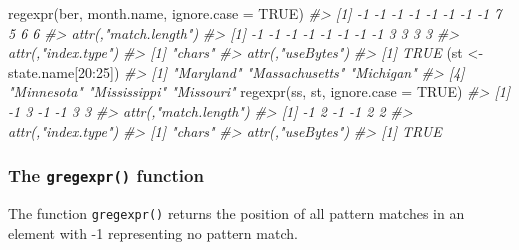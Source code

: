\documentclass[
]{book}
\newenvironment{Shaded}{\begin{snugshade}}{\end{snugshade}}
\newcommand{\AttributeTok}[1]{\textcolor[rgb]{0.77,0.63,0.00}{#1}}
\newcommand{\CommentTok}[1]{\textcolor[rgb]{0.56,0.35,0.01}{\textit{#1}}}
\newcommand{\ConstantTok}[1]{\textcolor[rgb]{0.00,0.00,0.00}{#1}}
\newcommand{\DecValTok}[1]{\textcolor[rgb]{0.00,0.00,0.81}{#1}}
\newcommand{\FunctionTok}[1]{\textcolor[rgb]{0.00,0.00,0.00}{#1}}
\newcommand{\NormalTok}[1]{#1}
\newcommand{\OtherTok}[1]{\textcolor[rgb]{0.56,0.35,0.01}{#1}}
\newcommand{\SpecialCharTok}[1]{\textcolor[rgb]{0.00,0.00,0.00}{#1}}
\newcommand{\StringTok}[1]{\textcolor[rgb]{0.31,0.60,0.02}{#1}}
\begin{document}
\begin{Shaded}
\begin{Highlighting}[]
\FunctionTok{regexpr}\NormalTok{(}\StringTok{\textquotesingle{}ber\textquotesingle{}}\NormalTok{, month.name, }\AttributeTok{ignore.case =} \ConstantTok{TRUE}\NormalTok{)}
\CommentTok{\#\textgreater{}  [1] {-}1 {-}1 {-}1 {-}1 {-}1 {-}1 {-}1 {-}1  7  5  6  6}
\CommentTok{\#\textgreater{} attr(,"match.length")}
\CommentTok{\#\textgreater{}  [1] {-}1 {-}1 {-}1 {-}1 {-}1 {-}1 {-}1 {-}1  3  3  3  3}
\CommentTok{\#\textgreater{} attr(,"index.type")}
\CommentTok{\#\textgreater{} [1] "chars"}
\CommentTok{\#\textgreater{} attr(,"useBytes")}
\CommentTok{\#\textgreater{} [1] TRUE}
\NormalTok{(st }\OtherTok{\textless{}{-}}\NormalTok{ state.name[}\DecValTok{20}\SpecialCharTok{:}\DecValTok{25}\NormalTok{])}
\CommentTok{\#\textgreater{} [1] "Maryland"      "Massachusetts" "Michigan"     }
\CommentTok{\#\textgreater{} [4] "Minnesota"     "Mississippi"   "Missouri"}
\FunctionTok{regexpr}\NormalTok{(}\StringTok{\textquotesingle{}ss\textquotesingle{}}\NormalTok{, st, }\AttributeTok{ignore.case =} \ConstantTok{TRUE}\NormalTok{)}
\CommentTok{\#\textgreater{} [1] {-}1  3 {-}1 {-}1  3  3}
\CommentTok{\#\textgreater{} attr(,"match.length")}
\CommentTok{\#\textgreater{} [1] {-}1  2 {-}1 {-}1  2  2}
\CommentTok{\#\textgreater{} attr(,"index.type")}
\CommentTok{\#\textgreater{} [1] "chars"}
\CommentTok{\#\textgreater{} attr(,"useBytes")}
\CommentTok{\#\textgreater{} [1] TRUE}
\end{Highlighting}
\end{Shaded}

\hypertarget{the-gregexpr-function}{%
\subsubsection{\texorpdfstring{The \texttt{gregexpr()} function}{The gregexpr() function}}\label{the-gregexpr-function}}

The function \texttt{gregexpr()} returns the position of all pattern matches in an element with -1 representing no pattern match.
\end{document}
